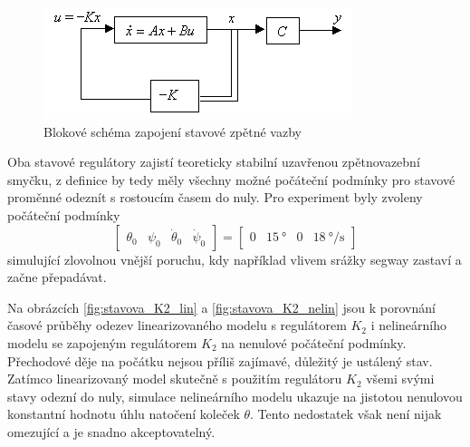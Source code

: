 \documentclass[conference]{IEEEtran}
\begin{document}
\begin{figure}[htbp]
    \centerline{\includegraphics[width=\linewidth]{full_state_feedback_schematic.png}}
    \caption{Blokové schéma zapojení stavové zpětné vazby}
    \label{fig:stavova_zv}        
\end{figure}

Oba stavové regulátory zajistí teoreticky stabilní uzavřenou zpětnovazební smyčku, z definice by tedy měly všechny možné počáteční
podmínky pro stavové proměnné odeznít s rostoucím časem do nuly. Pro experiment byly zvoleny počáteční podmínky
\begin{equation*}
    \begin{bmatrix}
        \theta_0 & \psi_0 & \dot{\theta}_0 & \dot{\psi}_0
    \end{bmatrix} = \begin{bmatrix}
        0 & 15~\si{\degree} & 0 & 18~\si{\degree\per\second}
    \end{bmatrix}
\end{equation*}
simulující zlovolnou vnější poruchu, kdy například vlivem srážky segway zastaví a začne přepadávat.

Na obrázcích \ref{fig:stavova_K2_lin} a \ref{fig:stavova_K2_nelin}
jsou k porovnání časové průběhy odezev linearizovaného modelu s regulátorem $K_2$ i nelineárního modelu se zapojeným regulátorem $K_2$ na nenulové počáteční podmínky.
Přechodové děje na počátku nejsou příliš zajímavé, důležitý je ustálený stav. Zatímco linearizovaný model skutečně s použitím regulátoru $K_2$ všemi svými stavy 
odezní do nuly, simulace nelineárního modelu ukazuje na jistotou nenulovou konstantní hodnotu úhlu natočení koleček $\theta$. Tento nedostatek však není nijak omezující
a je snadno akceptovatelný. 
\end{document}
